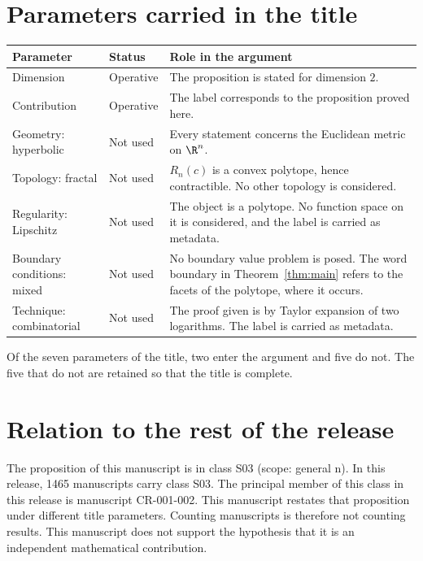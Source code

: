 \documentclass[11pt]{article}
\begin{document}
\section{Parameters carried in the title}\label{sec:params}
\begin{center}
\small
\begin{tabular}{p{}p{}p{}}
\toprule
Parameter & Status & Role in the argument \\
\midrule
Dimension & Operative & The proposition is stated for dimension $2$. \\
Contribution & Operative & The label corresponds to the proposition proved here. \\
Geometry: hyperbolic & Not used & Every statement concerns the Euclidean metric on $\R^n$. \\
Topology: fractal & Not used & $R_n(c)$ is a convex polytope, hence contractible. No other topology is considered. \\
Regularity: Lipschitz & Not used & The object is a polytope. No function space on it is considered, and the label is carried as metadata. \\
Boundary conditions: mixed & Not used & No boundary value problem is posed. The word boundary in Theorem~\ref{thm:main} refers to the facets of the polytope, where it occurs. \\
Technique: combinatorial & Not used & The proof given is by Taylor expansion of two logarithms. The label is carried as metadata. \\
\bottomrule
\end{tabular}
\end{center}
Of the seven parameters of the title, two enter the argument and five do not. The five that do not are retained so that the title is complete.

\section{Relation to the rest of the release}
The proposition of this manuscript is in class S03 (scope: general n).
In this release, 1465 manuscripts carry class S03. The principal member of this class in this release is manuscript CR-001-002. This manuscript restates that proposition under different title parameters.
Counting manuscripts is therefore not counting results. This manuscript does not support the hypothesis that it is an independent mathematical contribution.
\end{document}
